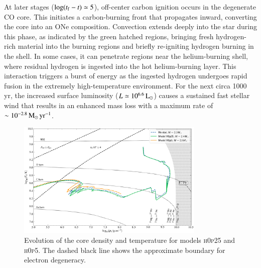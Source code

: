 \documentclass[main.tex]{subfiles}
\begin{document}
    At later stages ($\log(t_{\rm f} - t) \simeq 5$), off-center carbon ignition occurs in the degenerate CO core. This initiates a carbon-burning front that propagates inward, converting the core into an ONe composition. Convection extends deeply into the star during this phase, as indicated by the green hatched regions, bringing fresh hydrogen-rich material into the burning regions and briefly re-igniting hydrogen burning in the shell. In some cases, it can penetrate regions near the helium-burning shell, where residual hydrogen is ingested into the hot helium-burning layer. This interaction triggers a burst of energy as the ingested hydrogen undergoes rapid fusion in the extremely high-temperature environment. For the next circa 1000 yr, the increased surface luminosity ($L\simeq 10^{6.6}\mathrm{\,L_\odot}$) causes a sustained fast stellar wind that results in an enhanced mass loss with a maximum rate of $\sim 10^{-2.8}\mathrm{\,M_{\odot}\,yr^{-1}}$. 
    
    \begin{figure}
        \centering
        \includegraphics[width=0.8\textwidth]{figures/chapter3/rho_vs_temp.png}
        \caption{Evolution of the core density and temperature for models \textsc{h0p25} and \textsc{h0p5}. The dashed black line shows the approximate boundary for electron degeneracy.}
        \label{fig:rho_vs_temp_plot}
    \end{figure}
    
\end{document}
